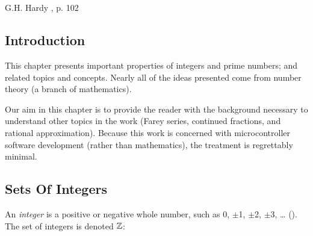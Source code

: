 
\chapter[\cprizeroshorttitle{}]{\cprizerolongtitle{}}

\label{cpri0}

                     {G.H. Hardy \cite{bibref:b:mathematiciansapology:1940}, p. 102}

\section{Introduction}
\label{cpri0:int0}

This chapter presents important properties of integers and prime numbers; and
related topics and concepts.  Nearly all of the ideas presented come from
number theory (a branch of mathematics).

Our aim in this chapter is to provide the reader
with the background necessary to understand other 
topics in the work (Farey series,
continued fractions, and rational approximation).
Because this work is concerned with microcontroller
software development (rather than  mathematics),
the treatment is regrettably minimal.


\section{Sets Of Integers}
\label{cpri0:soi0}

An
\emph{integer} is a positive or negative whole number, such as 0,
$\pm$1, $\pm$2, $\pm$3, \ldots{} (\cite{bibref:b:penguindictionaryofmathematics:2ded}).
The set of integers is denoted ${\mathbb{Z}}$:%

